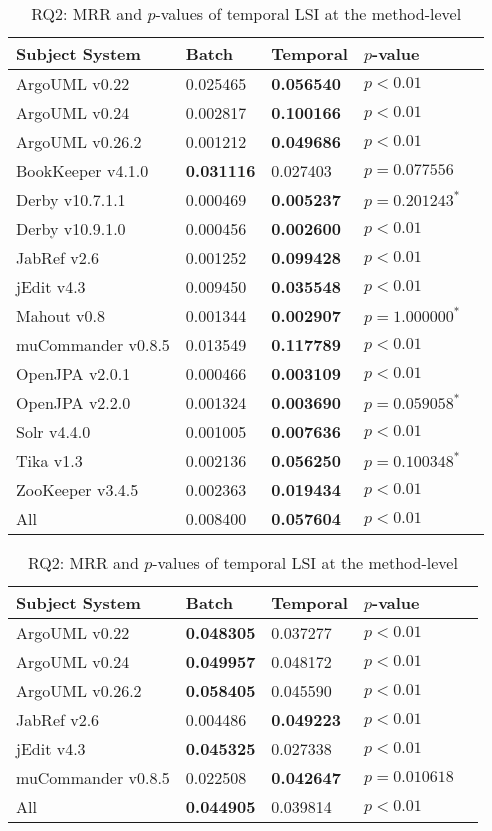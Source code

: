 \begin{table}[t]
\renewcommand{\arraystretch}{1.3}
\footnotesize
\centering
\caption{RQ2: MRR and $p$-values of temporal LSI at the class-level}
\begin{tabular}{l|ll|ll}
\toprule
Subject System & Batch & Temporal & $p$-value  \\
\midrule
ArgoUML v0.22 & 0.025465 & {\bf 0.056540 } & $p < 0.01$ \\
ArgoUML v0.24 & 0.002817 & {\bf 0.100166 } & $p < 0.01$ \\
ArgoUML v0.26.2 & 0.001212 & {\bf 0.049686 } & $p < 0.01$ \\
BookKeeper v4.1.0 & {\bf 0.031116 } & 0.027403 & $p = 0.077556$ \\
Derby v10.7.1.1 & 0.000469 & {\bf 0.005237 } & $p = 0.201243^{*}$ \\
Derby v10.9.1.0 & 0.000456 & {\bf 0.002600 } & $p < 0.01$ \\
JabRef v2.6 & 0.001252 & {\bf 0.099428 } & $p < 0.01$ \\
jEdit v4.3 & 0.009450 & {\bf 0.035548 } & $p < 0.01$ \\
Mahout v0.8 & 0.001344 & {\bf 0.002907 } & $p = 1.000000^{*}$ \\
muCommander v0.8.5 & 0.013549 & {\bf 0.117789 } & $p < 0.01$ \\
OpenJPA v2.0.1 & 0.000466 & {\bf 0.003109 } & $p < 0.01$ \\
OpenJPA v2.2.0 & 0.001324 & {\bf 0.003690 } & $p = 0.059058^{*}$ \\
Solr v4.4.0 & 0.001005 & {\bf 0.007636 } & $p < 0.01$ \\
Tika v1.3 & 0.002136 & {\bf 0.056250 } & $p = 0.100348^{*}$ \\
ZooKeeper v3.4.5 & 0.002363 & {\bf 0.019434 } & $p < 0.01$ \\
\midrule
All & 0.008400 & {\bf 0.057604 } & $p < 0.01$ \\
\bottomrule
\end{tabular}
\label{table:rq2:class:lsi}
\caption{RQ2: MRR and $p$-values of temporal LSI at the method-level}
\begin{tabular}{l|ll|ll}
\toprule
Subject System & Batch & Temporal & $p$-value  \\
\midrule
ArgoUML v0.22 & {\bf 0.048305 } & 0.037277 & $p < 0.01$ \\
ArgoUML v0.24 & {\bf 0.049957 } & 0.048172 & $p < 0.01$ \\
ArgoUML v0.26.2 & {\bf 0.058405 } & 0.045590 & $p < 0.01$ \\
JabRef v2.6 & 0.004486 & {\bf 0.049223 } & $p < 0.01$ \\
jEdit v4.3 & {\bf 0.045325 } & 0.027338 & $p < 0.01$ \\
muCommander v0.8.5 & 0.022508 & {\bf 0.042647 } & $p = 0.010618$ \\
\midrule
All & {\bf 0.044905 } & 0.039814 & $p < 0.01$ \\
\bottomrule
\end{tabular}
\label{table:rq2:method:lsi}
\end{table}
